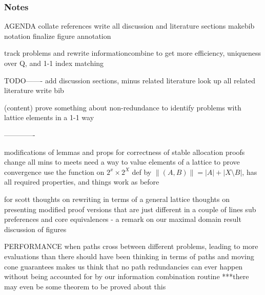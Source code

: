 \documentclass[11pt,reqno]{amsart}
\theoremstyle{definition}
\numberwithin{equation}{section}
\begin{document}
\clearpage

\subsubsection{Notes}

AGENDA
collate references 
write all discussion and literature sections
makebib
notation finalize
figure annotation

track problems and rewrite informationcombine to get more efficiency, uniqueness over Q, and 1-1 index matching


TODO-------
add discussion sections, minus related literature
look up all related literature
write bib

(content)
prove something about non-redundance to identify problems with lattice elements in a 1-1 way

-------------

modifications of lemmas and props for correctness of stable allocation proofs
    change all mins to meets
    need a way to value elements of a lattice to prove convergence 
    use the function on $2^x \times 2^X$ def by $\|(A,B) \| = |A| + |X \setminus B|$, has all required properties, and things work as before

for scott 
    thoughts on rewriting in terms of a general lattice
    thoughts on presenting modified proof versions that are just different in a couple of lines
    sub preferences and core equivalences - a remark on our maximal domain result
    discussion of figures 

PERFORMANCE 
    when paths cross between different problems, leading to more evaluations than there should have been
    thinking in terms of paths and moving cone guarantees makes us think that no path redundancies can ever happen without being accounted for by our information combination routine
    ***there may even be some theorem to be proved about this
\end{document}

